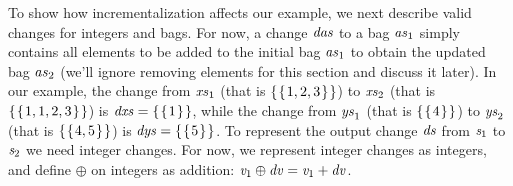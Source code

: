 \begin{example}
  \label{ex:valid-bag-int}
  \label{ex:chs-int}
To show how incrementalization affects our example, we next
describe valid changes for integers and bags.
%
For now, a change
\ensuremath{\Varid{das}} to a bag \ensuremath{\Varid{as}_{1}} simply contains all elements to be added to
the initial bag \ensuremath{\Varid{as}_{1}} to obtain the updated bag \ensuremath{\Varid{as}_{2}} (we'll ignore
removing elements for this section and discuss it later). In our
example, the change from \ensuremath{\Varid{xs}_{1}} (that is \ensuremath{\{\mskip1.5mu \{\mskip1.5mu \mathrm{1},\mathrm{2},\mathrm{3}\mskip1.5mu\}\mskip1.5mu\}}) to \ensuremath{\Varid{xs}_{2}}
(that is \ensuremath{\{\mskip1.5mu \{\mskip1.5mu \mathrm{1},\mathrm{1},\mathrm{2},\mathrm{3}\mskip1.5mu\}\mskip1.5mu\}}) is \ensuremath{\Varid{dxs}\mathrel{=}\{\mskip1.5mu \{\mskip1.5mu \mathrm{1}\mskip1.5mu\}\mskip1.5mu\}}, while the change
from \ensuremath{\Varid{ys}_{1}} (that is \ensuremath{\{\mskip1.5mu \{\mskip1.5mu \mathrm{4}\mskip1.5mu\}\mskip1.5mu\}}) to \ensuremath{\Varid{ys}_{2}} (that is \ensuremath{\{\mskip1.5mu \{\mskip1.5mu \mathrm{4},\mathrm{5}\mskip1.5mu\}\mskip1.5mu\}}) is
\ensuremath{\Varid{dys}\mathrel{=}\{\mskip1.5mu \{\mskip1.5mu \mathrm{5}\mskip1.5mu\}\mskip1.5mu\}}.
%
To represent the output change \ensuremath{\Varid{ds}} from
\ensuremath{\Varid{s}_{1}} to \ensuremath{\Varid{s}_{2}} we need integer changes. For now, we
represent integer changes as integers, and define \ensuremath{\oplus } on
integers as addition: \ensuremath{\Varid{v}_{1}\oplus \Varid{dv}\mathrel{=}\Varid{v}_{1}\mathbin{+}\Varid{dv}}.
\end{example}

